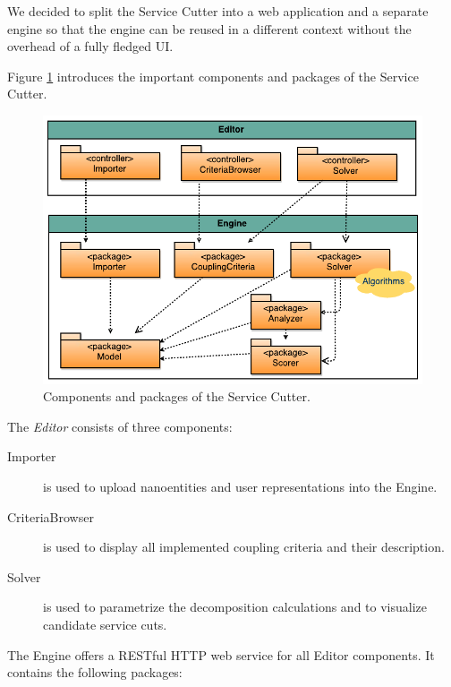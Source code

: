 We decided to split the Service Cutter into a web application and a separate engine so that the engine can be reused in a different context without the overhead of a fully fledged \gls{UI}.

Figure \ref{fig:packages} introduces the important components and packages of the Service Cutter.

\begin{figure}[H]
	\begin{center}
		\includegraphics[scale=1.1]{diagrams/PackageDiagram.pdf}
		\caption{Components and packages of the Service Cutter.}
		\label{fig:packages}
	\end{center}
\end{figure}

The \textit{Editor} consists of three components:

\begin{description}
	\item[Importer] is used to upload nanoentities and user representations into the Engine.
	\item[CriteriaBrowser] is used to display all implemented coupling criteria and their description.
	\item[Solver] is used to parametrize the decomposition calculations and to visualize candidate service cuts.
\end{description}

The Engine offers a RESTful HTTP web service for all Editor components. It contains the following packages:


